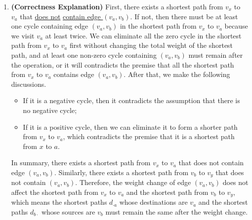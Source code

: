 \documentclass[12pt,a4paper]{article}
\makeatletter
\newtheorem*{solution}{Solution}
\theoremstyle{definition}
\renewenvironment{solution}[1][Solution] {\par\pushQED{\qed}\normalfont\topsep6\p@\@plus6\p@\relax\trivlist\item[\hskip\labelsep\bfseries#1\@addpunct{.}]\ignorespaces}{\popQED\endtrivlist\@endpefalse} \makeatother
\makeatother
\begin{document}
\begin{enumerate}
\begin{solution}
        \textbf{(Correctness Explanation)} First, there exists a shortest path from $v_x$ to $v_a$ that \underline{does not} \underline{contain edge $(v_a, v_b)$}. If not, then there must be at least one cycle containing edge $(v_a, v_b)$ in the shortest path from $v_x$ to $v_a$ because we visit $v_a$ at least twice. We can eliminate all the zero cycle in the shortest path from $v_x$ to $v_a$ first without changing the total weight of the shortest path, and at least one non-zero cycle containing $(v_a, v_b)$ must remain after the operation, or it will contradicts the premise that all the shortest path from $v_x$ to $v_a$ contains edge $(v_a, v_b)$. After that, we make the following discussions.
        \begin{itemize}
        \item If it is a negative cycle, then it contradicts the assumption that there is no negative cycle;
        \item If it is a positive cycle, then we can eliminate it to form a shorter path from $v_x$ to $v_a$, which contradicts the premise that it is a shortest path from $x$ to $a$.
        \end{itemize}
        In summary, there exists a shortest path from $v_x$ to $v_a$ that does not contain edge $(v_a, v_b)$. Similarly, there exists a shortest path from $v_b$ to $v_y$ that does not contain $(v_a, v_b)$. Therefore, {\color{blue}the weight change of edge $(v_a, v_b)$ does not affect the shortest path from $v_x$ to $v_a$ and the shortest path from $v_b$ to $v_y$}, which means the shortest paths $d_{\cdot a}$ whose destinations are $v_a$ and the shortest paths $d_{b \cdot}$ whose sources are $v_b$ must remain the same after the weight change.


\end{solution}
\end{enumerate}
\end{document}
